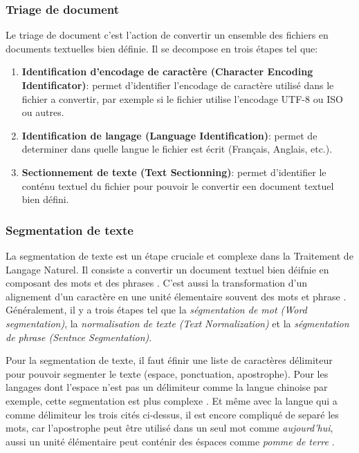 \subsubsection{Triage de document}
Le triage de document c'est l'action de convertir un ensemble des fichiers en documents textuelles bien définie. Il se decompose en trois étapes tel que:
\begin{enumerate}
    \item \textbf{Identification d'encodage de caractère (Character Encoding Identificator)}: permet d'identifier l'encodage de caractère utilisé dans le fichier a convertir, par exemple si le fichier utilise l'encodage UTF-8 ou ISO ou autres.
    \item \textbf{Identification de langage (Language Identification)}: permet de determiner dans quelle langue le fichier est écrit (Français, Anglais, etc.).
    \item \textbf{Sectionnement de texte (Text Sectionning)}: permet d'identifier le conténu textuel du fichier pour pouvoir le convertir een document textuel bien défini.
\end{enumerate}

\subsubsection{Segmentation de texte}
La segmentation de texte est un étape cruciale et complexe dans la Traitement de Langage Naturel. Il consiste a convertir un document textuel bien déifnie en composant des mots et des phrases \citep{handbook-nlp}. C'est aussi la transformation d'un alignement d'un caractère en une unité élementaire souvent des mots et phrase \citep{automatic-nlp}. Généralement, il y a trois étapes tel que la \textit{ségmentation de mot (Word segmentation)}, la \textit{normalisation de texte (Text Normalization)} et la \textit{ségmentation de phrase (Sentnce Segmentation)}.

Pour la segmentation de texte, il faut éfinir une liste de caractères délimiteur pour pouvoir segmenter le texte (espace, ponctuation, apostrophe). Pour les langages dont l'espace n'est pas un délimiteur comme la langue chinoise par exemple, cette segmentation est plus complexe \citep{handbook-nlp}. Et même avec la langue qui a comme délimiteur les trois cités ci-dessus, il est encore compliqué de separé les mots, car l'apostrophe peut être utilisé dans un seul mot comme \textit{aujourd'hui}, aussi un unité élémentaire peut conténir des éspaces comme \textit{pomme de terre} \citep{automatic-nlp}.

